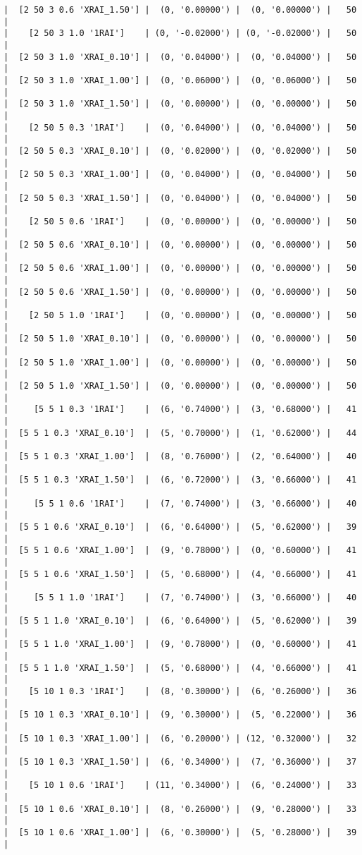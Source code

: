 \documentclass{article}
\begin{document}
\begin{verbatim}
|  [2 50 3 0.6 'XRAI_1.50'] |  (0, '0.00000') |  (0, '0.00000') |   50  |
|    [2 50 3 1.0 '1RAI']    | (0, '-0.02000') | (0, '-0.02000') |   50  |
|  [2 50 3 1.0 'XRAI_0.10'] |  (0, '0.04000') |  (0, '0.04000') |   50  |
|  [2 50 3 1.0 'XRAI_1.00'] |  (0, '0.06000') |  (0, '0.06000') |   50  |
|  [2 50 3 1.0 'XRAI_1.50'] |  (0, '0.00000') |  (0, '0.00000') |   50  |
|    [2 50 5 0.3 '1RAI']    |  (0, '0.04000') |  (0, '0.04000') |   50  |
|  [2 50 5 0.3 'XRAI_0.10'] |  (0, '0.02000') |  (0, '0.02000') |   50  |
|  [2 50 5 0.3 'XRAI_1.00'] |  (0, '0.04000') |  (0, '0.04000') |   50  |
|  [2 50 5 0.3 'XRAI_1.50'] |  (0, '0.04000') |  (0, '0.04000') |   50  |
|    [2 50 5 0.6 '1RAI']    |  (0, '0.00000') |  (0, '0.00000') |   50  |
|  [2 50 5 0.6 'XRAI_0.10'] |  (0, '0.00000') |  (0, '0.00000') |   50  |
|  [2 50 5 0.6 'XRAI_1.00'] |  (0, '0.00000') |  (0, '0.00000') |   50  |
|  [2 50 5 0.6 'XRAI_1.50'] |  (0, '0.00000') |  (0, '0.00000') |   50  |
|    [2 50 5 1.0 '1RAI']    |  (0, '0.00000') |  (0, '0.00000') |   50  |
|  [2 50 5 1.0 'XRAI_0.10'] |  (0, '0.00000') |  (0, '0.00000') |   50  |
|  [2 50 5 1.0 'XRAI_1.00'] |  (0, '0.00000') |  (0, '0.00000') |   50  |
|  [2 50 5 1.0 'XRAI_1.50'] |  (0, '0.00000') |  (0, '0.00000') |   50  |
|     [5 5 1 0.3 '1RAI']    |  (6, '0.74000') |  (3, '0.68000') |   41  |
|  [5 5 1 0.3 'XRAI_0.10']  |  (5, '0.70000') |  (1, '0.62000') |   44  |
|  [5 5 1 0.3 'XRAI_1.00']  |  (8, '0.76000') |  (2, '0.64000') |   40  |
|  [5 5 1 0.3 'XRAI_1.50']  |  (6, '0.72000') |  (3, '0.66000') |   41  |
|     [5 5 1 0.6 '1RAI']    |  (7, '0.74000') |  (3, '0.66000') |   40  |
|  [5 5 1 0.6 'XRAI_0.10']  |  (6, '0.64000') |  (5, '0.62000') |   39  |
|  [5 5 1 0.6 'XRAI_1.00']  |  (9, '0.78000') |  (0, '0.60000') |   41  |
|  [5 5 1 0.6 'XRAI_1.50']  |  (5, '0.68000') |  (4, '0.66000') |   41  |
|     [5 5 1 1.0 '1RAI']    |  (7, '0.74000') |  (3, '0.66000') |   40  |
|  [5 5 1 1.0 'XRAI_0.10']  |  (6, '0.64000') |  (5, '0.62000') |   39  |
|  [5 5 1 1.0 'XRAI_1.00']  |  (9, '0.78000') |  (0, '0.60000') |   41  |
|  [5 5 1 1.0 'XRAI_1.50']  |  (5, '0.68000') |  (4, '0.66000') |   41  |
|    [5 10 1 0.3 '1RAI']    |  (8, '0.30000') |  (6, '0.26000') |   36  |
|  [5 10 1 0.3 'XRAI_0.10'] |  (9, '0.30000') |  (5, '0.22000') |   36  |
|  [5 10 1 0.3 'XRAI_1.00'] |  (6, '0.20000') | (12, '0.32000') |   32  |
|  [5 10 1 0.3 'XRAI_1.50'] |  (6, '0.34000') |  (7, '0.36000') |   37  |
|    [5 10 1 0.6 '1RAI']    | (11, '0.34000') |  (6, '0.24000') |   33  |
|  [5 10 1 0.6 'XRAI_0.10'] |  (8, '0.26000') |  (9, '0.28000') |   33  |
|  [5 10 1 0.6 'XRAI_1.00'] |  (6, '0.30000') |  (5, '0.28000') |   39  |

\end{verbatim}
\end{document}
